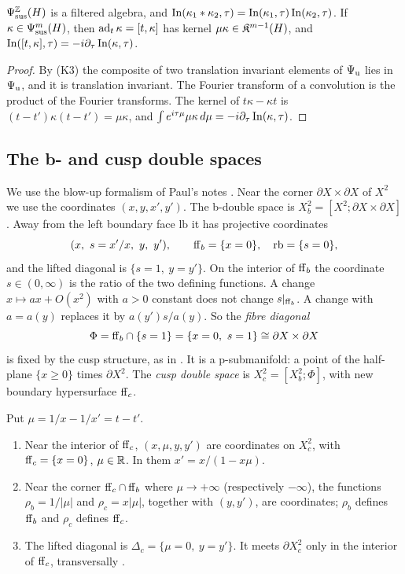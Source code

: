 \begin{lemma}\label{cc:lem:sus}
\(\Psi_{\mathrm{sus}}^{\mathbb Z}(H)\) is a filtered algebra, and
\(\operatorname{In}(\kappa_1*\kappa_2,\tau)=\operatorname{In}(\kappa_1,\tau)\operatorname{In}(\kappa_2,\tau)\). If
\(\kappa\in\Psi_{\mathrm{sus}}^m(H)\), then \(\operatorname{ad}_t\kappa=[t,\kappa]\) has kernel
\(\mu\kappa\in\mathfrak K^{m-1}(H)\), and
\(\operatorname{In}([t,\kappa],\tau)=-i\partial_\tau\operatorname{In}(\kappa,\tau)\).
\end{lemma}

\begin{proof}
By (K3) the composite of two translation invariant elements of \(\Psi_{\mathrm u}\)
lies in \(\Psi_{\mathrm u}\), and it is translation invariant. The Fourier transform
of a convolution is the product of the Fourier transforms. The kernel of
\(t\kappa-\kappa t\) is \((t-t')\kappa(t-t')=\mu\kappa\), and
\(\int e^{i\tau\mu}\mu\kappa\,d\mu=-i\partial_\tau\operatorname{In}(\kappa,\tau)\).
\end{proof}

\subsection{The b- and cusp double spaces}\label{cc:subsec:double}
We use the blow-up formalism of Paul's notes \cite{Notes}. Near the corner
\(\partial X\times\partial X\) of \(X^2\) we use the coordinates
\((x,y,x',y')\). The b-double space is
\(X_b^2=[X^2;\partial X\times\partial X]\). Away from the left boundary
face \(\mathrm{lb}\) it has projective coordinates
\[
 (x,\ s=x'/x,\ y,\ y'),\qquad \ffb=\{x=0\},\quad \mathrm{rb}=\{s=0\},
\]
and the lifted diagonal is \(\{s=1,\ y=y'\}\). On the interior of
\(\mathrm{ff}_b\) the coordinate \(s\in(0,\infty)\) is the ratio of the two
defining functions. A change \(x\mapsto ax+O(x^2)\) with \(a>0\) constant
does not change \(s|_{\mathrm{ff}_b}\). A change with \(a=a(y)\) replaces it by
\(a(y')s/a(y)\). So the \emph{fibre diagonal}
\[
 \Phi=\mathrm{ff}_b\cap\{s=1\}=\{x=0,\ s=1\}\cong\partial X\times\partial X
\]
is fixed by the cusp structure, as in \cite[(116)]{MN}. It is a
p-submanifold: a point of the half-plane \(\{x\ge0\}\) times
\(\partial X^2\). The \emph{cusp double space} is
\(X_c^2=[X_b^2;\Phi]\), with new boundary hypersurface \(\mathrm{ff}_c\).

\begin{lemma}[Coordinates on \(X_c^2\)]\label{cc:lem:coords}
Put \(\mu=1/x-1/x'=t-t'\).
\begin{enumerate}
\item Near the interior of \(\mathrm{ff}_c\), \((x,\mu,y,y')\) are coordinates on
\(X_c^2\), with \(\mathrm{ff}_c=\{x=0\}\), \(\mu\in\mathbb R\). In them
\(x'=x/(1-x\mu)\).
\item Near the corner \(\mathrm{ff}_c\cap\mathrm{ff}_b\) where \(\mu\to+\infty\)
(respectively \(-\infty\)), the functions \(\rho_b=1/|\mu|\) and
\(\rho_c=x|\mu|\), together with \((y,y')\), are coordinates; \(\rho_b\)
defines \(\mathrm{ff}_b\) and \(\rho_c\) defines \(\mathrm{ff}_c\).
\item The lifted diagonal is \(\Delta_c=\{\mu=0,\ y=y'\}\). It meets
\(\partial X_c^2\) only in the interior of \(\mathrm{ff}_c\), transversally
\textup{\cite[Lemma~22]{MN}}.
\end{enumerate}
\end{lemma}

